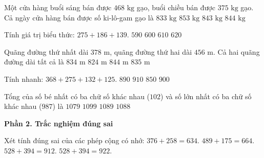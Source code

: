 \begin{ex} %
Một cửa hàng buổi sáng bán được $468\text{ kg}$ gạo, buổi chiều bán được $375\text{ kg}$ gạo. Cả ngày cửa hàng bán được số ki-lô-gam gạo là
\choice
{$833\text{ kg}$}
{$853\text{ kg}$}
{\True $843\text{ kg}$}
{$844\text{ kg}$}
\end{ex}

\begin{ex} %
Tính giá trị biểu thức: $275 + 186 + 139$.
\choice
{$590$}
{\True $600$}
{$610$}
{$620$}
\end{ex}

\begin{ex} %
Quãng đường thứ nhất dài $378\text{ m}$, quãng đường thứ hai dài $456\text{ m}$. Cả hai quãng đường dài tất cả là
\choice
{\True $834\text{ m}$}
{$824\text{ m}$}
{$844\text{ m}$}
{$835\text{ m}$}
\end{ex}

\begin{ex} %
Tính nhanh: $368 + 275 + 132 + 125$.
\choice
{$890$}
{$910$}
{$850$}
{\True $900$}
\end{ex}

\begin{ex} %
Tổng của số bé nhất có ba chữ số khác nhau ($102$) và số lớn nhất có ba chữ số khác nhau ($987$) là
\choice
{$1079$}
{$1099$}
{\True $1089$}
{$1088$}
\end{ex}

\textbf{Phần 2. Trắc nghiệm đúng sai}

\begin{ex} %
Xét tính đúng sai của các phép cộng có nhớ:
\choiceTF
{\True $376 + 258 = 634$.}
{\True $489 + 175 = 664$.}
{$528 + 394 = 912$.}
{\True $528 + 394 = 922$.}
\end{ex}

